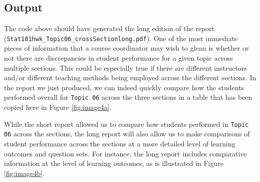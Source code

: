 \documentclass[11pt,a4paper,oldfontcommands,openany]{memoir}
\numberwithin{equation}{section} %
\begin{document}
\subsection{Output}

The code above should have generated the long edition of the report (\texttt{Stat101hwk\_Topic06\_crossSection\-long.pdf}). One of the most immediate pieces of information that a course coordinator may wish to glean is whether or not there are discrepancies in student performance for a given topic across multiple sections. This could be especially true if there are different instructors and/or different teaching methods being employed across the different sections. In the report we just produced, we can indeed quickly compare how the students performed overall for \texttt{Topic 06} across the three sections in a table that has been copied here in Figure \ref{fig:image4a}.

\begin{center}
\captionsetup{width=0.7\textwidth}
\label{fig:image4a}
\end{center}

While the short report allowed us to compare how students performed in \texttt{Topic 06} across the sections, the long report will also allow us to make comparisons of student performance across the sections at a more detailed level of learning outcomes and question sets. For instance, the long report includes comparative information at the level of learning outcomes, as is illustrated in Figure \ref{fig:image4b}.
\end{document}
